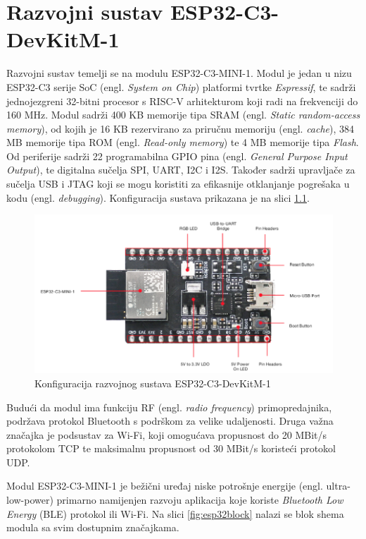 \chapter{Razvojni sustav ESP32-C3-DevKitM-1}

Razvojni sustav temelji se na modulu ESP32-C3-MINI-1. Modul je jedan u nizu ESP32-­C3 serije SoC (engl. \textit{System on Chip}) platformi tvrtke \textit{Espressif}, te sadrži jednojezgreni 32-bitni procesor s RISC-V arhitekturom koji radi na frekvenciji do 160 MHz. Modul sadrži 400 KB memorije tipa SRAM (engl. \textit{Static random-access memory}), od kojih je 16 KB rezervirano za priručnu memoriju (engl. \textit{cache}), 384 MB memorije tipa ROM (engl. \textit{Read-only memory}) te 4 MB memorije tipa \textit{Flash}. Od periferije sadrži 22 programabilna GPIO pina (engl. \textit{General Purpose Input Output}), te digitalna sučelja SPI, UART, I2C i I2S. Također sadrži upravljače za sučelja USB i JTAG koji se mogu koristiti za efikasnije otklanjanje pogrešaka u kodu (engl. \textit{debugging}). \cite{esp32manual} Konfiguracija sustava prikazana je na slici \ref{fig:esp32}.

\begin{figure}[ht]
	\centering
	\includegraphics[scale=0.6]{imgs/esp32}
	\caption{Konfiguracija razvojnog sustava ESP32-C3-DevKitM-1 \cite{espressif}}
	\label{fig:esp32}
\end{figure}

Budući da modul ima funkciju RF (engl. \textit{radio frequency}) primopredajnika, podržava protokol Bluetooth s podrškom za velike udaljenosti. Druga važna značajka je podsustav za Wi-Fi, koji omogućava propusnost do 20 MBit/s protokolom TCP te maksimalnu propusnost od 30 MBit/s koristeći protokol UDP. 

Modul ESP32-C3-MINI-1 je bežični uređaj niske potrošnje energije (engl. ultra-low-power) primarno namijenjen razvoju aplikacija koje koriste \textit{Bluetooth Low Energy} (BLE) protokol ili Wi-Fi. Na slici \ref{fig:esp32block} nalazi se blok shema modula sa svim dostupnim značajkama.

